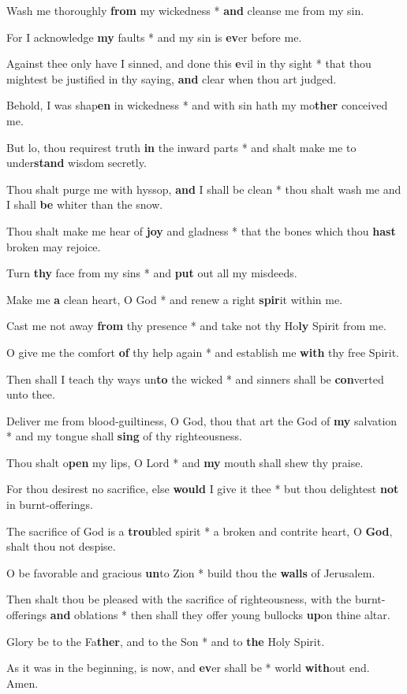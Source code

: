 \begin{multicols}{2}
	Wash me thoroughly \textbf{from} my wickedness * \textbf{and} cleanse me from my sin.
	
	For I acknowledge \textbf{my} faults * and my sin is \textbf{ev}er before me.
	
	Against thee only have I sinned, and done this \textbf{e}vil in thy sight * that thou mightest be justified in thy saying, \textbf{and} clear when thou art judged.
	
	Behold, I was shap\textbf{en} in wickedness * and with sin hath my mo\textbf{ther} conceived me.
	
	But lo, thou requirest truth \textbf{in} the inward parts * and shalt make me to under\textbf{stand} wisdom secretly.
	
	Thou shalt purge me with hyssop, \textbf{and} I shall be clean * thou shalt wash me and I shall \textbf{be} whiter than the snow.
	
	Thou shalt make me hear of \textbf{joy} and gladness * that the bones which thou \textbf{hast} broken may rejoice.
	
	Turn \textbf{thy} face from my sins * and \textbf{put} out all my misdeeds.
	
	Make me \textbf{a} clean heart, O God * and renew a right \textbf{spir}it within me.
	
	Cast me not away \textbf{from} thy presence * and take not thy Ho\textbf{ly} Spirit from me.
	
	O give me the comfort \textbf{of} thy help again * and establish me \textbf{with} thy free Spirit.
	
	Then shall I teach thy ways un\textbf{to} the wicked * and sinners shall be \textbf{con}verted unto thee.
	
	Deliver me from blood-guiltiness, O God, thou that art the God of \textbf{my} salvation * and my tongue shall \textbf{sing} of thy righteousness.
	
	Thou shalt o\textbf{pen} my lips, O Lord * and \textbf{my} mouth shall shew thy praise.
	
	For thou desirest no sacrifice, else \textbf{would} I give it thee * but thou delightest \textbf{not} in burnt-offerings.
	
	The sacrifice of God is a \textbf{trou}bled spirit * a broken and contrite heart, O \textbf{God}, shalt thou not despise.
	
	O be favorable and gracious \textbf{un}to Zion * build thou the \textbf{walls} of Jerusalem.
	
	Then shalt thou be pleased with the sacrifice of righteousness, with the burnt-offerings \textbf{and} oblations * then shall they offer young bullocks \textbf{up}on thine altar.
	
	Glory be to the Fa\textbf{ther}, and to the Son * and to \textbf{the} Holy Spirit.
	
	As it was in the beginning, is now, and \textbf{ev}er shall be * world \textbf{with}out end. Amen.
\end{multicols}